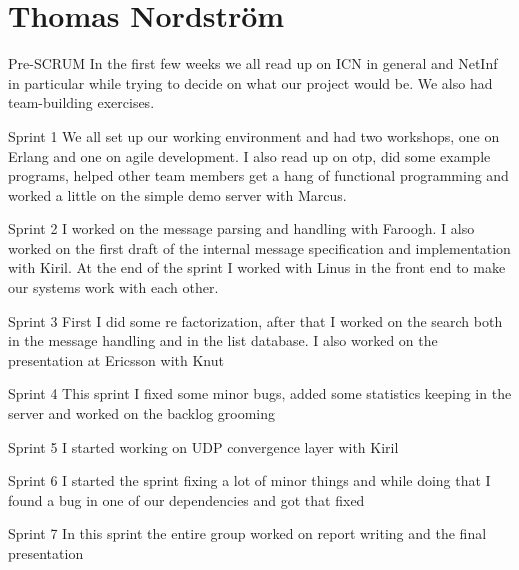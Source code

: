 \section{Thomas Nordstr\"om}

Pre-SCRUM
In the first few weeks we all read up on ICN in general and NetInf in particular while trying to decide on what our project would be. We also had team-building exercises.

Sprint 1
We all set up our working environment and had two workshops, one on Erlang and one on agile development. I also read up on otp, did some example programs, helped other team members get a hang of functional programming and worked a little on the simple demo server with Marcus.

Sprint 2
I worked on the message parsing and handling with Faroogh. I also worked on the first draft of the internal message specification and implementation with Kiril. At the end of the sprint I worked with Linus in the front end to make our systems work with each other.

Sprint 3
First I did some re factorization, after that I worked on the search both in the message handling and in the list database. I also worked on the presentation at Ericsson with Knut

Sprint 4
This sprint I fixed some minor bugs, added some statistics keeping in the server and worked on the backlog grooming

Sprint 5
I started working on UDP convergence layer with Kiril

Sprint 6
I started the sprint fixing a lot of minor things and while doing that I found a bug in one of our dependencies and got that fixed

Sprint 7
In this sprint the entire group worked on report writing and the final presentation